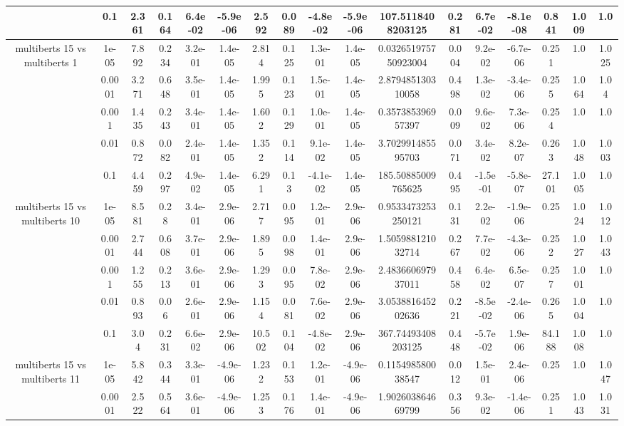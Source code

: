\begin{tabular}{|c|c|c|c|c|c|c|c|c|c|c|c|c|c|c|c|c|}
 & 0.1 & 2.361 & 0.164 & 6.4e-02 & -5.9e-06 & 2.592 & 0.089 & -4.8e-02 & -5.9e-06 & 107.5118408203125 & 0.281 & 6.7e-02 & -8.1e-08 & 0.841 & 1.009 & 1.0 \\
\hline
\multirow{5}{*}{multiberts 15 vs multiberts 1} & 1e-05 & 7.892 & 0.234 & 3.2e-01 & 1.4e-05 & 2.814 & 0.125 & 1.3e-01 & 1.4e-05 & 0.032651975750923004 & 0.004 & 9.2e-02 & -6.7e-06 & 0.251 & 1.0 & 1.025 \\
 & 0.0001 & 3.271 & 0.648 & 3.5e-01 & 1.4e-05 & 1.995 & 0.123 & 1.5e-01 & 1.4e-05 & 2.879485130310058 & 0.498 & 1.3e-02 & -3.4e-06 & 0.255 & 1.064 & 1.04 \\
 & 0.001 & 1.435 & 0.243 & 3.4e-01 & 1.4e-05 & 1.602 & 0.129 & 1.0e-01 & 1.4e-05 & 0.357385396957397 & 0.009 & 9.6e-02 & 7.3e-06 & 0.254 & 1.0 & 1.0 \\
 & 0.01 & 0.872 & 0.082 & 2.4e-01 & 1.4e-05 & 1.352 & 0.114 & 9.1e-02 & 1.4e-05 & 3.702991485595703 & 0.071 & 3.4e-02 & 8.2e-07 & 0.263 & 1.048 & 1.003 \\
 & 0.1 & 4.459 & 0.297 & 4.9e-02 & 1.4e-05 & 6.291 & 0.13 & -4.1e-02 & 1.4e-05 & 185.50885009765625 & 0.495 & -1.5e-01 & -5.8e-07 & 27.101 & 1.005 & 1.0 \\
\hline
\multirow{5}{*}{multiberts 15 vs multiberts 10} & 1e-05 & 8.581 & 0.28 & 3.4e-01 & 2.9e-06 & 2.717 & 0.095 & 1.2e-01 & 2.9e-06 & 0.9533473253250121 & 0.131 & 2.2e-02 & -1.9e-06 & 0.25 & 1.024 & 1.012 \\
 & 0.0001 & 2.744 & 0.608 & 3.7e-01 & 2.9e-06 & 1.895 & 0.098 & 1.4e-01 & 2.9e-06 & 1.505988121032714 & 0.267 & 7.7e-02 & -4.3e-06 & 0.252 & 1.027 & 1.043 \\
 & 0.001 & 1.255 & 0.213 & 3.6e-01 & 2.9e-06 & 1.293 & 0.095 & 7.8e-02 & 2.9e-06 & 2.483660697937011 & 0.458 & 6.4e-02 & 6.5e-07 & 0.257 & 1.001 & 1.0 \\
 & 0.01 & 0.893 & 0.06 & 2.6e-01 & 2.9e-06 & 1.154 & 0.081 & 7.6e-02 & 2.9e-06 & 3.053881645202636 & 0.221 & -8.5e-02 & -2.4e-06 & 0.265 & 1.004 & 1.0 \\
 & 0.1 & 3.04 & 0.231 & 6.6e-02 & 2.9e-06 & 10.502 & 0.104 & -4.8e-02 & 2.9e-06 & 367.74493408203125 & 0.448 & -5.7e-02 & 1.9e-06 & 84.188 & 1.008 & 1.0 \\
\hline
\multirow{5}{*}{multiberts 15 vs multiberts 11} & 1e-05 & 5.842 & 0.344 & 3.3e-01 & -4.9e-06 & 1.232 & 0.153 & 1.2e-01 & -4.9e-06 & 0.115498580038547 & 0.012 & 1.5e-01 & 2.4e-06 & 0.25 & 1.0 & 1.047 \\
 & 0.0001 & 2.522 & 0.564 & 3.6e-01 & -4.9e-06 & 1.253 & 0.176 & 1.4e-01 & -4.9e-06 & 1.902603864669799 & 0.356 & 9.3e-02 & -1.4e-06 & 0.251 & 1.043 & 1.031 \\

\end{tabular}
